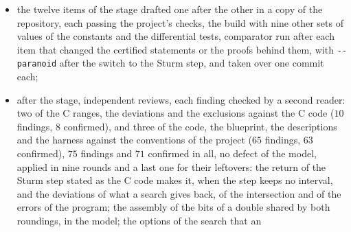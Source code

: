 \begin{itemize}
    exactly, and $13$ in \verb|test4high|; $162$ of the $165$ runs of \verb|test4.sh| with a search
    region and the one of \verb|test3.sh|, then the three runs under \verb|-1| at the heights
    $10^{12}$ and $2^{63} - 1$, under a cap on the memory; larger runs with two other seeds; $11000$
    whole outcomes of the search with a callback against \verb|find_points|; $2000$ runs of the
    Sturm step against \verb|_ratpoints_compute_sturm|; $4558$ comparisons of message~8; and glibc's
    \verb|strtod| and \verb|printf|'s \verb|%f| on $46000$ lines. Four reviews of the sketch, of the
    library against the C code, of the program against \verb|main.c|, of the harness and of the
    specification, each finding checked by a second reader: $42$ findings, $37$ confirmed, $4$ in
    part and $1$ refuted, no defect of the model. Then a prototype of all the proofs on the sketch,
    in which the whole library, the program, the challenge and the solution build, with no
    \verb|sorry| outside the challenge and the standard axioms, \verb|lake comparator --paranoid|
    accepts the twelve statements, the build with nine other sets of values of the constants passes,
    and the differential tests pass. And a review of the plan of this chapter by five readers ($67$
    findings, $59$ confirmed and $8$ in part), each finding checked by a second reader;
  \item the twelve items of the stage drafted one after the other in a copy of the repository, each
    passing the project's checks, the build with nine other sets of values of the constants and the
    differential tests, comparator run after each item that changed the certified statements or the
    proofs behind them, with \verb|--paranoid| after the switch to the Sturm step, and taken over
    one commit each;
  \item after the stage, independent reviews, each finding checked by a second reader: two of the C
    ranges, the deviations and the exclusions against the C code ($10$ findings, $8$ confirmed), and
    three of the code, the blueprint, the descriptions and the harness against the conventions of
    the project ($65$ findings, $63$ confirmed), $75$ findings and $71$ confirmed in all, no defect
    of the model, applied in nine rounds and a last one for their leftovers: the return of the Sturm
    step stated as the C code makes it, when the step keeps no interval, and the deviations of what
    a search gives back, of the intersection and of the errors of the program; the assembly of the
    bits of a double shared by both roundings, in the model; the options of the search that an

\end{itemize}
